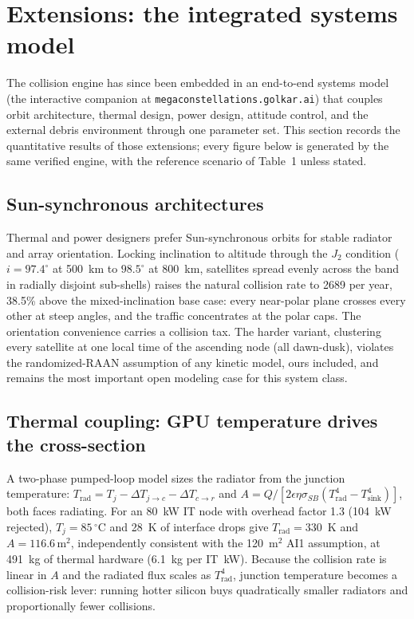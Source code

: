 \documentclass[11pt,a4paper]{article}
\begin{document}
\section{Extensions: the integrated systems model}
\label{sec:extensions}

The collision engine has since been embedded in an end-to-end systems model
(the interactive companion at \texttt{megaconstellations.golkar.ai}) that couples
orbit architecture, thermal design, power design, attitude control, and the external
debris environment through one parameter set. This section records the quantitative
results of those extensions; every figure below is generated by the same verified
engine, with the reference scenario of Table~1 unless stated.

\subsection{Sun-synchronous architectures}

Thermal and power designers prefer Sun-synchronous orbits for stable radiator and
array orientation. Locking inclination to altitude through the $J_2$ condition
($i = 97.4^\circ$ at 500~km to $98.5^\circ$ at 800~km, satellites spread evenly
across the band in radially disjoint sub-shells) raises the natural collision rate
to 2689 per year, 38.5\% above the mixed-inclination base case: every near-polar
plane crosses every other at steep angles, and the traffic concentrates at the
polar caps. The orientation convenience carries a collision tax. The harder variant,
clustering every satellite at one local time of the ascending node (all dawn-dusk),
violates the randomized-RAAN assumption of any kinetic model, ours included, and
remains the most important open modeling case for this system class.

\subsection{Thermal coupling: GPU temperature drives the cross-section}

A two-phase pumped-loop model sizes the radiator from the junction temperature:
$T_{\mathrm{rad}} = T_j - \Delta T_{j\to c} - \Delta T_{c\to r}$ and
$A = Q / [2\epsilon\eta\sigma_{SB}(T_{\mathrm{rad}}^4 - T_{\mathrm{sink}}^4)]$,
both faces radiating. For an 80~kW IT node with overhead factor 1.3 (104~kW
rejected), $T_j = 85\,^\circ$C and 28~K of interface drops give
$T_{\mathrm{rad}} = 330$~K and $A = 116.6\,\mathrm{m}^2$, independently consistent
with the 120~$\mathrm{m}^2$ AI1 assumption, at 491~kg of thermal hardware
(6.1~kg per IT~kW). Because the collision rate is linear in $A$ and the radiated
flux scales as $T_{\mathrm{rad}}^4$, junction temperature becomes a collision-risk
lever: running hotter silicon buys quadratically smaller radiators and
proportionally fewer collisions.
\end{document}

